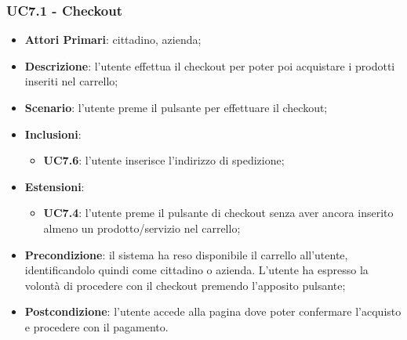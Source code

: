 \subsubsection{UC7.1 - Checkout}
\begin{itemize}
	\item \textbf{Attori Primari}: cittadino, azienda;
	\item \textbf{Descrizione}: l'utente effettua il checkout per poter poi acquistare i prodotti inseriti nel carrello;
	\item \textbf{Scenario}: l'utente preme il pulsante per effettuare il checkout;
	\item \textbf{Inclusioni}: 
	\begin{itemize}
		\item \textbf{UC7.6}: l'utente inserisce l'indirizzo di spedizione;
	\end{itemize}
	\item \textbf{Estensioni}: 
	\begin{itemize}
		\item \textbf{UC7.4}: l'utente preme il pulsante di checkout senza aver ancora inserito almeno un prodotto/servizio nel carrello;
	\end{itemize}
	\item \textbf{Precondizione}: il sistema ha reso disponibile il carrello all'utente, identificandolo quindi come cittadino o azienda. L'utente ha espresso la volontà di procedere con il checkout premendo l'apposito pulsante;
	\item \textbf{Postcondizione}: l'utente accede alla pagina dove poter confermare l'acquisto e procedere con il pagamento.
\end{itemize}

